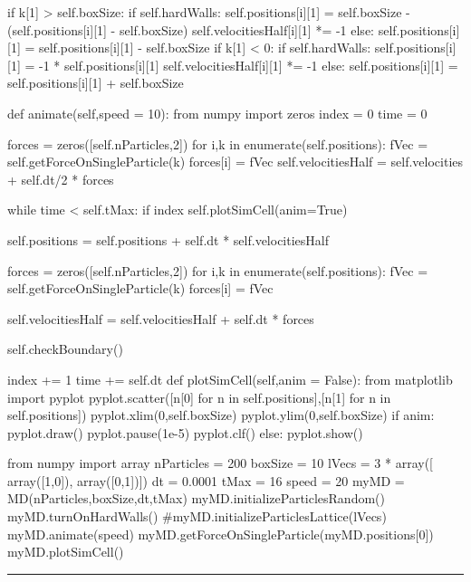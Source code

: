 \begin{codeexample}
\begin{VerbatimOut}{\listingFile}
            if k[1] > self.boxSize:
                if self.hardWalls:
                    self.positions[i][1] = self.boxSize - (self.positions[i][1] - self.boxSize)
                    self.velocitiesHalf[i][1] *= -1
                else:
                    self.positions[i][1] = self.positions[i][1] - self.boxSize
            if k[1] < 0:
                if self.hardWalls:
                    self.positions[i][1] = -1 * self.positions[i][1]
                    self.velocitiesHalf[i][1] *= -1
                else:
                    self.positions[i][1] = self.positions[i][1] + self.boxSize

    def animate(self,speed = 10):
        from numpy import zeros
        index = 0
        time = 0

        forces = zeros([self.nParticles,2])
        for i,k in enumerate(self.positions):
            fVec = self.getForceOnSingleParticle(k)
            forces[i] = fVec
        self.velocitiesHalf = self.velocities + self.dt/2 * forces

        while time < self.tMax:
            if index %
                self.plotSimCell(anim=True)


            self.positions = self.positions + self.dt * self.velocitiesHalf

            forces = zeros([self.nParticles,2])
            for i,k in enumerate(self.positions):
                fVec = self.getForceOnSingleParticle(k)
                forces[i] = fVec

            self.velocitiesHalf = self.velocitiesHalf + self.dt * forces

            self.checkBoundary()


            index += 1
            time += self.dt
    def plotSimCell(self,anim = False):
        from matplotlib import pyplot
        pyplot.scatter([n[0] for n in self.positions],[n[1] for n in self.positions])
        pyplot.xlim(0,self.boxSize)
        pyplot.ylim(0,self.boxSize)
        if anim:
            pyplot.draw()
            pyplot.pause(1e-5)
            pyplot.clf()
        else:
            pyplot.show()

from numpy import array
nParticles = 200
boxSize = 10
lVecs = 3 * array([ array([1,0]), array([0,1])])
dt = 0.0001
tMax = 16
speed = 20
myMD = MD(nParticles,boxSize,dt,tMax)
myMD.initializeParticlesRandom()
myMD.turnOnHardWalls()
#myMD.initializeParticlesLattice(lVecs)
myMD.animate(speed)
myMD.getForceOnSingleParticle(myMD.positions[0])
myMD.plotSimCell()


\end{VerbatimOut}
\end{codeexample}
\else
\noindent\rule{5 in}{0.01 in}
\fi

